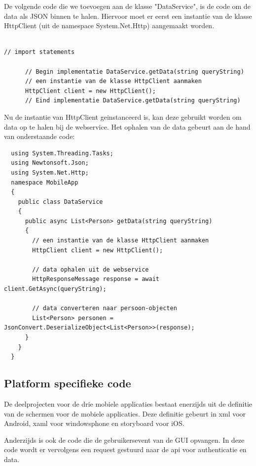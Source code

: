 De volgende code die we toevoegen aan de klasse "DataService", is de code om de data als JSON binnen te halen.
Hiervoor moet er eerst een instantie van de klasse HttpClient (uit de namespace System.Net.Http) aangemaakt worden.
\begin{lstlisting}

// import statements

      // Begin implementatie DataService.getData(string queryString)
      // een instantie van de klasse HttpClient aanmaken
      HttpClient client = new HttpClient();
      // Eind implementatie DataService.getData(string queryString)

\end{lstlisting}
Nu de instantie van HttpClient geinstanceerd is, kan deze gebruikt worden om data op te halen bij de webservice.
Het ophalen van de data gebeurt aan de hand van onderstaande code:
\begin{lstlisting}
  using System.Threading.Tasks;
  using Newtonsoft.Json;
  using System.Net.Http;
  namespace MobileApp
  {
    public class DataService
    {
      public async List<Person> getData(string queryString)
      {
        // een instantie van de klasse HttpClient aanmaken
        HttpClient client = new HttpClient();

        // data ophalen uit de webservice
        HttpResponseMessage response = await client.GetAsync(queryString);

        // data converteren naar persoon-objecten
        List<Person> personen = JsonConvert.DeserializeObject<List<Person>>(response);
      }
    }
  }
\end{lstlisting}



\subsection{Platform specifieke code}
De deelprojecten voor de drie mobiele applicaties bestaat enerzijds uit de definitie van de schermen voor de mobiele applicaties.
Deze definitie gebeurt in xml voor Android, xaml voor windowsphone en storyboard voor iOS.

Anderzijds is ook de code die de gebruikersevent van de GUI opvangen. In deze code wordt er vervolgens een request gestuurd naar
de api voor authenticatie en data.
